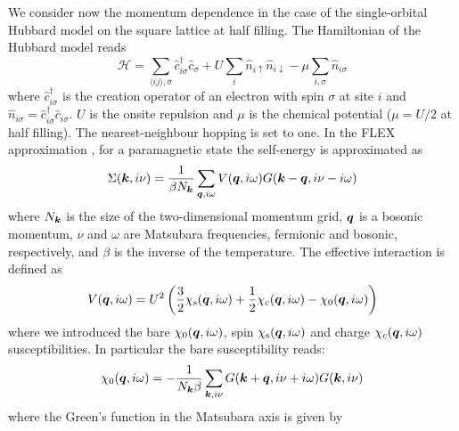 We consider now the momentum dependence in the case of the single-orbital Hubbard model on the square lattice at half filling. 
The Hamiltonian of the Hubbard model reads
\begin{equation}
    \mathcal{H} = \sum_{\langle ij \rangle, \sigma} \hat{c}^\dag_{i\sigma}\hat{c}_{\sigma} + U \sum_{i} \hat{n}_{i\uparrow}\hat{n}_{i\downarrow} - \mu\sum_{i,\sigma}\hat{n}_{i\sigma}
    \label{eq:HubbardHamiltonian}
\end{equation}
where $\hat{c}^\dag_{i\sigma}$ is the creation operator of an electron with spin $\sigma$ at site $i$ and $\hat{n}_{i\sigma}=\hat{c}^\dag_{i\sigma}\hat{c}_{i\sigma}$. $U$ is the onsite repulsion and $\mu$ is the chemical potential ($\mu=U/2$ at half filling). The nearest-neighbour hopping is set to one.
In the FLEX approximation \cite{Bickers1989}, for a paramagnetic state the self-energy is approximated as
\begin{equation}
    \Sigma(\boldsymbol{k}, i\nu) = \frac{1}{\beta N_{\boldsymbol{k}} } \sum_{\boldsymbol{q},i\omega}V(\boldsymbol{q}, i\omega) G(\boldsymbol{k} - \boldsymbol{q}, i\nu - i\omega)
\end{equation}
where $N_{\boldsymbol{k}}$ is the size of the two-dimensional momentum grid, $\boldsymbol{q}$ is a bosonic momentum, $\nu$ and $\omega$ are Matsubara frequencies, fermionic and bosonic, respectively, and $\beta$ is the inverse of the temperature. The effective interaction is defined as
\begin{equation}
    V(\boldsymbol{q}, i\omega) = U^2\left(\frac{3}{2} \chi_{\text{s}}(\boldsymbol{q}, i\omega) + \frac{1}{2} \chi_{c}(\boldsymbol{q}, i\omega) - \chi_{0}(\boldsymbol{q}, i\omega)\right)
\end{equation}
where we introduced the bare $\chi_{0}(\boldsymbol{q}, i\omega)$, spin $\chi_{\text{s}}(\boldsymbol{q}, i\omega)$ and charge $\chi_{c}(\boldsymbol{q}, i\omega)$ susceptibilities. In particular the bare susceptibility reads:
\begin{equation}
    \chi_{0}(\boldsymbol{q}, i\omega) = -\frac{1}{N_{\boldsymbol{k}}\beta} \sum_{\boldsymbol{k}, i\nu} G(\boldsymbol{k} + \boldsymbol{q},i\nu + i\omega)G(\boldsymbol{k}, i\nu)
    \label{eq:bareSusceptibility}
\end{equation}
where the Green's function in the Matsubara axis is given by 

